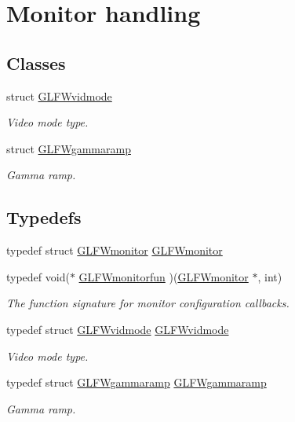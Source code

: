 \hypertarget{group__monitor}{\section{\-Monitor handling}
\label{group__monitor}
}
\subsection*{\-Classes}
\begin{DoxyCompactItemize}
\item 
struct \hyperlink{structGLFWvidmode}{\-G\-L\-F\-Wvidmode}
\begin{DoxyCompactList}\small\item\em \-Video mode type. \end{DoxyCompactList}\item 
struct \hyperlink{structGLFWgammaramp}{\-G\-L\-F\-Wgammaramp}
\begin{DoxyCompactList}\small\item\em \-Gamma ramp. \end{DoxyCompactList}\end{DoxyCompactItemize}
\subsection*{\-Typedefs}
\begin{DoxyCompactItemize}
\item 
typedef struct \hyperlink{group__monitor_ga8d9efd1cde9426692c73fe40437d0ae3}{\-G\-L\-F\-Wmonitor} \hyperlink{group__monitor_ga8d9efd1cde9426692c73fe40437d0ae3}{\-G\-L\-F\-Wmonitor}
\item 
typedef void($\ast$ \hyperlink{group__monitor_ga67b74af6cecfdbccc7e57a6319a57210}{\-G\-L\-F\-Wmonitorfun} )(\hyperlink{group__monitor_ga8d9efd1cde9426692c73fe40437d0ae3}{\-G\-L\-F\-Wmonitor} $\ast$, int)
\begin{DoxyCompactList}\small\item\em \-The function signature for monitor configuration callbacks. \end{DoxyCompactList}\item 
typedef struct \hyperlink{structGLFWvidmode}{\-G\-L\-F\-Wvidmode} \hyperlink{group__monitor_gae48aadf4ea0967e6605c8f58fa5daccb}{\-G\-L\-F\-Wvidmode}
\begin{DoxyCompactList}\small\item\em \-Video mode type. \end{DoxyCompactList}\item 
typedef struct \hyperlink{structGLFWgammaramp}{\-G\-L\-F\-Wgammaramp} \hyperlink{group__monitor_gaec0bd37af673be8813592849f13e02f0}{\-G\-L\-F\-Wgammaramp}
\begin{DoxyCompactList}\small\item\em \-Gamma ramp. \end{DoxyCompactList}\end{DoxyCompactItemize}
